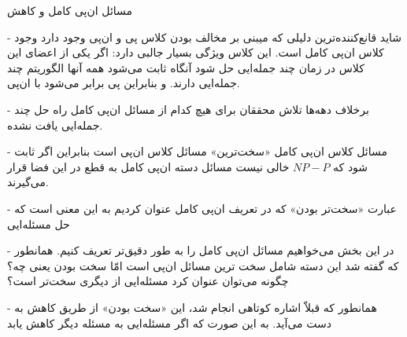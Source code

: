 \begin{itemframe}{مسائل ان‌پی کامل و کاهش}
\item[-]
شاید قانع‌کننده‌ترین دلیلی که میبنی بر مخالف بودن کلاس پی و ان‌پی وجود دارد وجود کلاس ان‌پی کامل است. این کلاس ویژگی بسیار جالبی دارد: اگر یکی از اعضای این کلاس در زمان چند جمله‌ایی حل شود آنگاه ثابت می‌شود همه آنها الگوریتم چند جمله‌ایی دارند. و بنابراین پی برابر می‌شود با ان‌پی.
\item[-]
برخلاف دهه‌ها تلاش محققان برای هیچ کدام از مسائل ان‌پی کامل راه حل چند جمله‌ایی یافت نشده.
\item[-]
مسائل کلاس ان‌پی کامل «سخت‌ترین» مسائل کلاس ان‌پی است بنابراین اگر ثابت شود که
$NP - P$
خالی نیست مسائل دسته  ان‌پی کامل به قطع در این فضا قرار می‌گیرند.
\item[-]
عبارت «سخت‌تر بودن» که در تعریف ان‌پی کامل عنوان کردیم به این معنی است که حل مسئله‌ایی
\item[-]
در این بخش می‌خواهیم مسائل ان‌پی کامل را به طور دقیق‌تر تعریف کنیم. همانطور که گفته شد این دسته شامل سخت ترین مسائل ان‌پی است امّا سخت بودن یعنی چه؟ چگونه می‌توان عنوان کرد مسئله‌ایی از دیگری سخت‌تر است؟
\item[-]
همانطور که قبلاّ اشاره کوتاهی انجام شد، این «سخت بودن» از طریق کاهش به دست می‌آید. به این صورت که اگر مسئله‌ایی به مسئله دیگر کاهش یابد
\end{itemframe}

